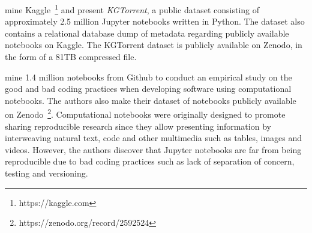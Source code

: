 \documentclass[acmsmall,screen,review,anonymous]{acmart}
\begin{document}

\citeauthor{quaranta2021kgtorrent} mine Kaggle~\footnote{https://kaggle.com} and present \textit{KGTorrent}, a public dataset consisting of approximately 2.5 million Jupyter notebooks written in Python. The dataset also contains a relational database dump of metadata regarding publicly available notebooks on Kaggle. The KGTorrent dataset is publicly available on Zenodo, in the form of a 81TB compressed file.

\citeauthor{pimentel2019large} mine 1.4 million notebooks from Github to conduct an empirical study on the good and bad coding practices when developing software using computational notebooks. The authors also make their dataset of notebooks publicly available on Zenodo~\footnote{https://zenodo.org/record/2592524}. Computational notebooks were originally designed to promote sharing reproducible research since they allow presenting information by interweaving natural text, code and other multimedia such as tables, images and videos. However, the authors discover that Jupyter notebooks are far from being reproducible due to bad coding practices such as lack of separation of concern, testing and versioning.



\end{document}
